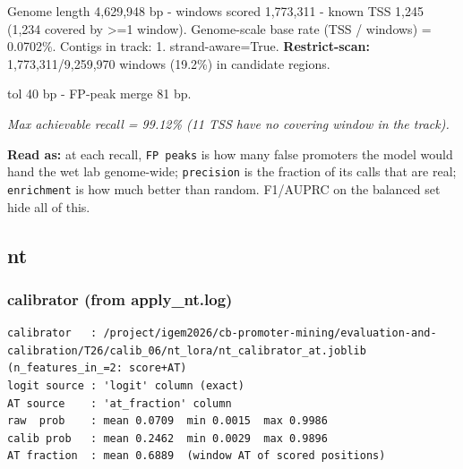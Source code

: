 \documentclass[10pt]{article}
\begin{document}
Genome length 4,629,948 bp - windows scored 1,773,311 - known TSS 1,245 (1,234 covered by >=1 window). Genome-scale base rate (TSS / windows) = 0.0702\%. Contigs in track: 1. strand-aware=True. \textbf{Restrict-scan:} 1,773,311/9,259,970 windows (19.2\%) in candidate regions.

tol 40 bp - FP-peak merge 81 bp.

\begin{center}
\end{center}

{\itshape Max achievable recall = 99.12\% (11 TSS have no covering window in the track).}

\textbf{Read as:} at each recall, \texttt{FP peaks} is how many false promoters the model would hand the wet lab genome-wide; \texttt{precision} is the fraction of its calls that are real; \texttt{enrichment} is how much better than random. F1/AUPRC on the balanced set hide all of this.

\subsection*{nt}

\subsubsection*{calibrator (from apply\_nt.log)}
\begin{verbatim}
calibrator   : /project/igem2026/cb-promoter-mining/evaluation-and-calibration/T26/calib_06/nt_lora/nt_calibrator_at.joblib  (n_features_in_=2: score+AT)
logit source : 'logit' column (exact)
AT source    : 'at_fraction' column
raw  prob    : mean 0.0709  min 0.0015  max 0.9986
calib prob   : mean 0.2462  min 0.0029  max 0.9896
AT fraction  : mean 0.6889  (window AT of scored positions)
\end{verbatim}
\end{document}

